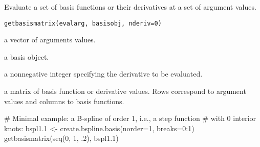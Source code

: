 \documentclass{article}
\begin{document}
\begin{Description}\relax
Evaluate a set of basis functions or their derivatives at
a set of argument values.
\end{Description}
\begin{Usage}
\begin{verbatim}
getbasismatrix(evalarg, basisobj, nderiv=0)
\end{verbatim}
\end{Usage}
\begin{Arguments}
\begin{ldescription}
\item[\code{evalarg}] a vector of arguments values.

\item[\code{basisobj}] a basis object.

\item[\code{nderiv}] a nonnegative integer specifying the derivative to be evaluated.

\end{ldescription}
\end{Arguments}
\begin{Value}
a matrix of basis function or derivative values.  Rows correspond
to argument values and columns to basis functions.
\end{Value}
\begin{SeeAlso}\relax
{}
\end{SeeAlso}
\begin{Examples}
\begin{ExampleCode}
# Minimal example:  a B-spline of order 1, i.e., a step function
# with 0 interior knots:
bspl1.1 <- create.bspline.basis(norder=1, breaks=0:1)
getbasismatrix(seq(0, 1, .2), bspl1.1)

\end{ExampleCode}
\end{Examples}
\end{document}
